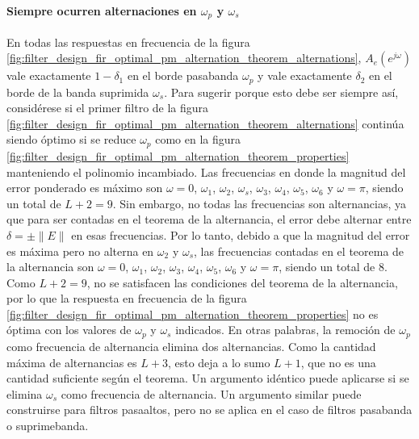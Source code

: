 \documentclass[a4paper]{report}
\begin{document}
\paragraph{Siempre ocurren alternaciones en \(\omega_p\) y \(\omega_s\)} En todas las respuestas en frecuencia de la figura \ref{fig:filter_design_fir_optimal_pm_alternation_theorem_alternations}, \(A_e(e^{j\omega})\) vale exactamente \(1-\delta_1\) en el borde pasabanda \(\omega_p\) y vale exactamente \(\delta_2\) en el borde de la banda suprimida \(\omega_s\). Para sugerir porque esto debe ser siempre así, considérese si el primer filtro de la figura \ref{fig:filter_design_fir_optimal_pm_alternation_theorem_alternations} continúa siendo óptimo si se reduce \(\omega_p\) como en la figura \ref{fig:filter_design_fir_optimal_pm_alternation_theorem_properties}  manteniendo el polinomio incambiado. Las frecuencias en donde la magnitud del error ponderado es máximo son \(\omega=0\), \(\omega_1\), \(\omega_2\), \(\omega_s\), \(\omega_3\), \(\omega_4\), \(\omega_5\), \(\omega_6\) y \(\omega=\pi\), siendo un total de \(L+2=9\). Sin embargo, no todas las frecuencias son alternancias, ya que para ser contadas en el teorema de la alternancia, el error debe alternar entre \(\delta=\pm\|E\|\) en esas frecuencias. Por lo tanto, debido a que la magnitud del error es máxima pero no alterna en \(\omega_2\) y \(\omega_s\), las frecuencias contadas en el teorema de la alternancia son \(\omega=0\), \(\omega_1\), \(\omega_2\), \(\omega_3\), \(\omega_4\), \(\omega_5\), \(\omega_6\) y \(\omega=\pi\), siendo un total de 8. Como \(L+2=9\), no se satisfacen las condiciones del teorema de la alternancia, por lo que la respuesta en frecuencia de la figura \ref{fig:filter_design_fir_optimal_pm_alternation_theorem_properties} no es  óptima con los valores de \(\omega_p\) y \(\omega_s\) indicados. En otras palabras, la remoción de \(\omega_p\) como frecuencia de alternancia elimina dos alternancias. Como la cantidad máxima de alternancias es \(L+3\), esto deja a lo sumo \(L+1\), que no es una cantidad suficiente según el teorema. Un argumento idéntico puede aplicarse si se elimina \(\omega_s\) como frecuencia de alternancia. Un argumento similar puede construirse para filtros pasaaltos, pero no se aplica en el caso de filtros pasabanda o suprimebanda. 
\end{document}
